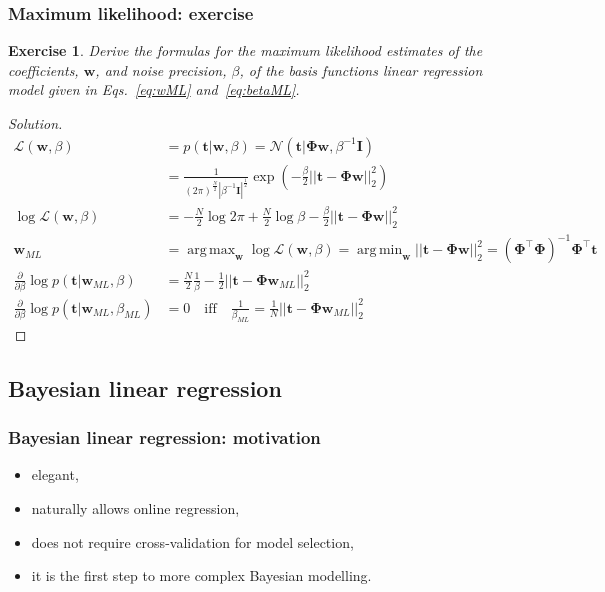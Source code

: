 \documentclass[11pt]{beamer}
\newtheorem{probExercise}{Exercise}
\DeclareMathOperator*{\argmax}{arg\,max}
\DeclareMathOperator*{\argmin}{arg\,min}
\begin{document}
\begin{frame}
    \frametitle{Maximum likelihood: exercise}

    \scriptsize
    \begin{probExercise}
        Derive the formulas for the maximum likelihood estimates of the
        coefficients, $\mathbf{w}$, and noise precision, $\beta$, of the basis
        functions linear regression model given in Eqs.~\ref{eq:wML}
        and~\ref{eq:betaML}.
    \end{probExercise}

    \tiny
    \begin{proof}[Solution]
        \begin{align*}
            \mathcal{L}(\mathbf{w},\beta)&=p(\mathbf{t}|\mathbf{w},\beta)=\mathcal{N}(\mathbf{t}|\boldsymbol{\Phi}\mathbf{w},\beta^{-1}\mathbf{I})\\
                                         &=\frac{1}{(2\pi)^\frac{N}{2}|\beta^{-1}\mathbf{I}|^\frac{1}{2}}\exp\left(-\frac{\beta}{2}||\mathbf{t}-\boldsymbol{\Phi}\mathbf{w}||_2^2\right)\\
            \log\mathcal{L}(\mathbf{w},\beta)&=-\frac{N}{2}\log{2\pi}+\frac{N}{2}\log\beta-\frac{\beta}{2}||\mathbf{t}-\boldsymbol{\Phi}\mathbf{w}||_2^2\\
            \mathbf{w}_{ML}&=\argmax_{\mathbf{w}}\log\mathcal{L}(\mathbf{w},\beta)=\argmin_{\mathbf{w}}||\mathbf{t}-\boldsymbol{\Phi}\mathbf{w}||_2^2=(\boldsymbol{\Phi}^\intercal\boldsymbol{\Phi})^{-1}\boldsymbol{\Phi}^\intercal\mathbf{t}\\
            \frac{\partial}{\partial\beta}\log p(\mathbf{t}|\mathbf{w}_{ML},\beta)&=\frac{N}{2}\frac{1}{\beta}-\frac{1}{2}||\mathbf{t}-\boldsymbol{\Phi}\mathbf{w}_{ML}||_2^2\\
            \frac{\partial}{\partial\beta}\log
            p(\mathbf{t}|\mathbf{w}_{ML},\beta_{ML})&=0\quad\text{iff}\quad\frac{1}{\beta_{ML}}=\frac{1}{N}||\mathbf{t}-\boldsymbol{\Phi}\mathbf{w}_{ML}||_2^2
        \end{align*}
		\phantom\qedhere
    \end{proof}
    \normalsize
\end{frame}

\subsection{Bayesian linear regression}

\begin{frame}
    \frametitle{Bayesian linear regression: motivation}

	\begin{itemize}
		\item elegant,
		\item naturally allows online regression,
		\item does not require cross-validation for model selection,
		\item it is the first step to more complex Bayesian modelling.
	\end{itemize}

\end{frame}
\end{document}
